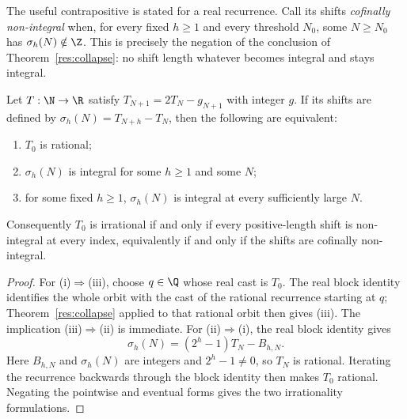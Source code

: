 \documentclass[11pt]{article}
\begin{document}
The useful contrapositive is stated for a real recurrence.  Call its shifts
\emph{cofinally non-integral} when, for every fixed $h\ge1$ and every
threshold $N_0$, some $N\ge N_0$ has $\sigma_h(N)\notin\Z$.  This is precisely
the negation of the conclusion of Theorem~\ref{res:collapse}: no shift length
whatever becomes integral and stays integral.

\begin{theorem}\label{res:escape-irrational}
Let $T:\N\to\R$ satisfy $T_{N+1}=2T_N-g_{N+1}$ with integer $g$.  If its
shifts are defined by $\sigma_h(N)=T_{N+h}-T_N$, then the following are
equivalent:
\begin{enumerate}[label=\textup{(\roman*)}]
\item $T_0$ is rational;
\item $\sigma_h(N)$ is integral for some $h\ge1$ and some $N$;
\item for some fixed $h\ge1$, $\sigma_h(N)$ is integral at every sufficiently
  large $N$.
\end{enumerate}
Consequently $T_0$ is irrational if and only if every positive-length shift
is non-integral at every index, equivalently if and only if the shifts are
cofinally non-integral.
\end{theorem}

\begin{proof}
For \textup{(i)}$\Rightarrow$\textup{(iii)}, choose $q\in\Q$ whose real cast
is $T_0$.  The real block identity identifies the whole orbit with the cast of
the rational recurrence starting at $q$; Theorem~\ref{res:collapse} applied to
that rational orbit then gives \textup{(iii)}.  The implication
\textup{(iii)}$\Rightarrow$\textup{(ii)} is immediate.  For
\textup{(ii)}$\Rightarrow$\textup{(i)}, the real block identity gives
\[
 \sigma_h(N)=(2^h-1)T_N-B_{h,N}.
\]
Here $B_{h,N}$ and $\sigma_h(N)$ are integers and $2^h-1\ne0$, so $T_N$ is
rational.  Iterating the recurrence backwards through the block identity then
makes $T_0$ rational.  Negating the pointwise and eventual forms gives the two
irrationality formulations.
\end{proof}
\end{document}
